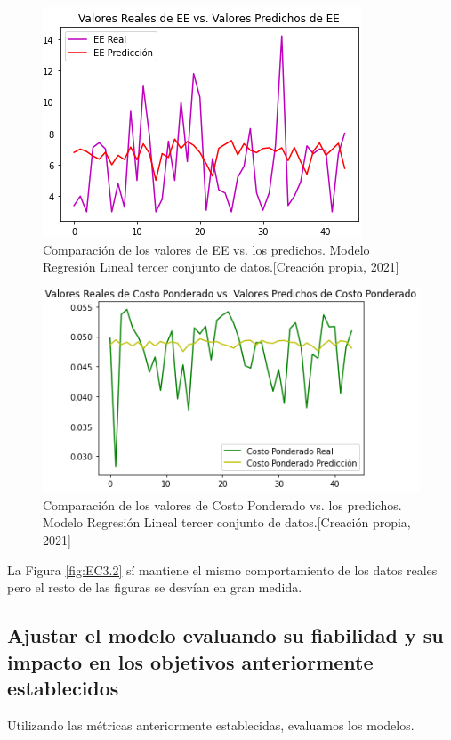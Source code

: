\documentclass{article}
\begin{document}
\begin{figure}[!h]
    \centering
    \includegraphics[scale=.7]{F4/F4-im30.PNG}
    \caption{Comparación de los valores de EE vs. los predichos. Modelo Regresión Lineal tercer conjunto de datos.[Creación propia, 2021]}
    \label{fig:EE3.2}
\end{figure}

\begin{figure}[!h]
    \centering
    \includegraphics[scale=.7]{F4/F4-im31.PNG}
    \caption{Comparación de los valores de Costo Ponderado vs. los predichos. Modelo Regresión Lineal tercer conjunto de datos.[Creación propia, 2021]}
    \label{fig:CostoPonderado3.2}
\end{figure}

\pagebreak La Figura \ref{fig:EC3.2} sí mantiene el mismo comportamiento de los datos reales pero el resto de las figuras se desvían en gran medida. 

\subsection{Ajustar el modelo evaluando su fiabilidad y su impacto en los objetivos anteriormente establecidos}\label{ajustar}
Utilizando las métricas anteriormente establecidas, evaluamos los modelos.
\end{document}
